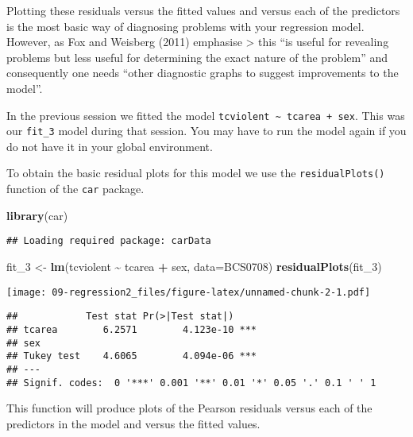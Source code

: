 \documentclass[
]{book}
\newenvironment{Shaded}{\begin{snugshade}}{\end{snugshade}}
\newcommand{\AttributeTok}[1]{\textcolor[rgb]{0.13,0.29,0.53}{#1}}
\newcommand{\FunctionTok}[1]{\textcolor[rgb]{0.13,0.29,0.53}{\textbf{#1}}}
\newcommand{\NormalTok}[1]{#1}
\newcommand{\OtherTok}[1]{\textcolor[rgb]{0.56,0.35,0.01}{#1}}
\newcommand{\SpecialCharTok}[1]{\textcolor[rgb]{0.81,0.36,0.00}{\textbf{#1}}}
\begin{document}
Plotting these residuals versus the fitted values and versus each of the predictors is the most basic way of diagnosing problems with your regression model. However, as Fox and Weisberg (2011) emphasise
\textgreater{} this ``is useful for revealing problems but less useful for determining the exact nature of the problem'' and consequently one needs ``other diagnostic graphs to suggest improvements to the model''.

In the previous session we fitted the model \texttt{tcviolent\ \textasciitilde{}\ tcarea\ +\ sex}. This was our \texttt{fit\_3} model during that session. You may have to run the model again if you do not have it in your global environment.

To obtain the basic residual plots for this model we use the \texttt{residualPlots()} function of the \texttt{car} package.

\begin{Shaded}
\begin{Highlighting}[]
\FunctionTok{library}\NormalTok{(car)}
\end{Highlighting}
\end{Shaded}

\begin{verbatim}
## Loading required package: carData
\end{verbatim}

\begin{Shaded}
\begin{Highlighting}[]
\NormalTok{fit\_3 }\OtherTok{\textless{}{-}} \FunctionTok{lm}\NormalTok{(tcviolent }\SpecialCharTok{\textasciitilde{}}\NormalTok{ tcarea }\SpecialCharTok{+}\NormalTok{ sex, }\AttributeTok{data=}\NormalTok{BCS0708)}
\FunctionTok{residualPlots}\NormalTok{(fit\_3)}
\end{Highlighting}
\end{Shaded}

\texttt{[image: 09-regression2\_files/figure-latex/unnamed-chunk-2-1.pdf]}

\begin{verbatim}
##            Test stat Pr(>|Test stat|)    
## tcarea        6.2571        4.123e-10 ***
## sex                                      
## Tukey test    4.6065        4.094e-06 ***
## ---
## Signif. codes:  0 '***' 0.001 '**' 0.01 '*' 0.05 '.' 0.1 ' ' 1
\end{verbatim}

This function will produce plots of the Pearson residuals versus each of the predictors in the model and versus the fitted values.
\end{document}
